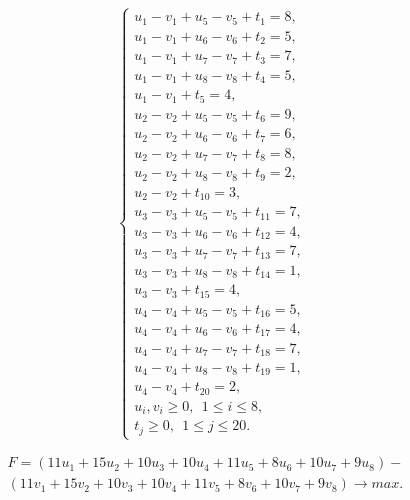 \documentclass{article}
\begin{document}
\begin{equation*}
    ~~~~
    \begin{cases}
        \displaystyle u_1 - v_1 + u_5 - v_5 + t_1 = 8,\\
        \displaystyle u_1 - v_1 + u_6 - v_6 + t_2 = 5,\\
        \displaystyle u_1 - v_1 + u_7 - v_7 + t_3 = 7,\\
        \displaystyle u_1 - v_1 + u_8 - v_8 + t_4 = 5,\\
        \displaystyle u_1 - v_1 + t_5 = 4,\\
        \displaystyle u_2 - v_2 + u_5 - v_5 + t_6 = 9,\\
        \displaystyle u_2 - v_2 + u_6 - v_6 + t_7 = 6,\\
        \displaystyle u_2 - v_2 + u_7 - v_7 + t_8 = 8,\\
        \displaystyle u_2 - v_2 + u_8 - v_8 + t_9 = 2,\\
        \displaystyle u_2 - v_2 + t_{10} = 3,\\
        \displaystyle u_3 - v_3 + u_5 - v_5 + t_{11} = 7,\\
        \displaystyle u_3 - v_3 + u_6 - v_6 + t_{12} = 4,\\
        \displaystyle u_3 - v_3 + u_7 - v_7 + t_{13} = 7,\\
        \displaystyle u_3 - v_3 + u_8 - v_8 + t_{14} = 1,\\
        \displaystyle u_3 - v_3 + t_{15} = 4,\\
        \displaystyle u_4 - v_4 + u_5 - v_5 + t_{16} = 5,\\
        \displaystyle u_4 - v_4 + u_6 - v_6 + t_{17} = 4,\\
        \displaystyle u_4 - v_4 + u_7 - v_7 + t_{18} = 7,\\
        \displaystyle u_4 - v_4 + u_8 - v_8 + t_{19} = 1,\\
        \displaystyle u_4 - v_4 + t_{20} = 2,\\
        \displaystyle u_{i}, v_i\geq 0,~~1\leq i \leq 8,\\
        \displaystyle t_{j}\geq 0,~~1\leq j \leq 20.
    \end{cases}
\end{equation*}


\begin{eqnarray*}
    F = (11u_1 + 15u_2 + 10u_3 + 10u_4 + 11u_5 + 8u_6 + 10u_7 + 9u_8) - \nonumber \\
    (11v_1 + 15v_2 + 10v_3 + 10v_4 + 11v_5 + 8v_6 + 10v_7 + 9v_8)\to max.
\end{eqnarray*}
\end{document}
